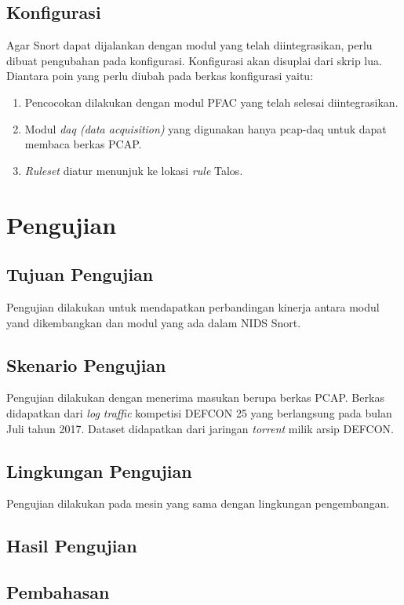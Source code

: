   \subsection{Konfigurasi}

    Agar Snort dapat dijalankan dengan modul yang telah diintegrasikan, perlu dibuat pengubahan pada konfigurasi. Konfigurasi akan disuplai dari skrip lua. Diantara poin yang perlu diubah pada berkas konfigurasi yaitu:

    \begin{enumerate}
      \item Pencocokan dilakukan dengan modul PFAC yang telah selesai diintegrasikan.
      \item Modul \emph{daq (data acquisition)} yang digunakan hanya pcap-daq untuk dapat membaca berkas PCAP.
      \item \emph{Ruleset} diatur menunjuk ke lokasi \emph{rule} Talos.
    \end{enumerate}

\section{Pengujian}

  \subsection{Tujuan Pengujian}
    Pengujian dilakukan untuk mendapatkan perbandingan kinerja antara modul yand dikembangkan dan modul yang ada dalam NIDS Snort. 

  \subsection{Skenario Pengujian}
  
    Pengujian dilakukan dengan menerima masukan berupa berkas PCAP. Berkas didapatkan dari \emph{log traffic} kompetisi DEFCON 25 yang berlangsung pada bulan Juli tahun 2017. Dataset didapatkan dari jaringan \emph{torrent} milik arsip DEFCON.
    
  \subsection{Lingkungan Pengujian}
    
    Pengujian dilakukan pada mesin yang sama dengan lingkungan pengembangan.
    
    

  \subsection{Hasil Pengujian}

  \subsection{Pembahasan}
